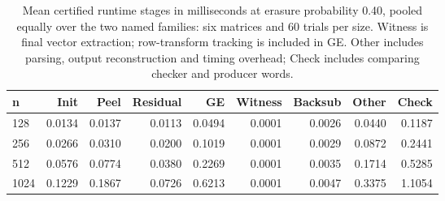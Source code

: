 \begin{table}
\centering
\small
\setlength{\tabcolsep}{3pt}
\caption{Mean certified runtime stages in milliseconds at erasure probability 0.40, pooled equally over the two named families: six matrices and 60 trials per size. Witness is final vector extraction; row-transform tracking is included in GE. Other includes parsing, output reconstruction and timing overhead; Check includes comparing checker and producer words.}
\label{tab:runtime-stages}
\begin{tabular}{lrrrrrrrr}
\toprule
n & Init & Peel & Residual & GE & Witness & Backsub & Other & Check \\
\midrule
128 & 0.0134 & 0.0137 & 0.0113 & 0.0494 & 0.0001 & 0.0026 & 0.0440 & 0.1187 \\
256 & 0.0266 & 0.0310 & 0.0200 & 0.1019 & 0.0001 & 0.0029 & 0.0872 & 0.2441 \\
512 & 0.0576 & 0.0774 & 0.0380 & 0.2269 & 0.0001 & 0.0035 & 0.1714 & 0.5285 \\
1024 & 0.1229 & 0.1867 & 0.0726 & 0.6213 & 0.0001 & 0.0047 & 0.3375 & 1.1054 \\
\bottomrule
\end{tabular}
\end{table}
